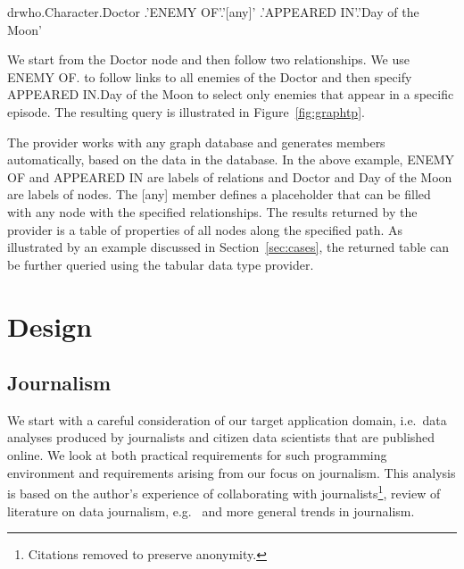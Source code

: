 \documentclass[manuscript,review,anonymous]{acmart}
\newcommand{\ikvd}[1]{{\fontfamily{zi4}\selectfont\small #1}}
\begin{document}
\begin{thegamma}
drwho.Character.Doctor
  .'ENEMY OF'.'[any]'
  .'APPEARED IN'.'Day of the Moon'
\end{thegamma}

\noindent
We start from the \ikvd{Doctor} node and then follow two relationships. We use
\ikvd{\textquotesingle ENEMY OF\textquotesingle.\textquotesingle [any]\textquotesingle}
to follow links to all enemies of the Doctor and then specify
\ikvd{\textquotesingle APPEARED IN\textquotesingle.\textquotesingle Day of the Moon\textquotesingle}
to select only enemies that appear in a specific episode. The resulting query
is illustrated in Figure~\ref{fig:graphtp}.

The provider works with any graph database and generates members automatically, based on the
data in the database. In the above example, \ikvd{ENEMY OF} and \ikvd{APPEARED IN} are labels
of relations and \ikvd{Doctor} and \ikvd{Day of the Moon} are labels of nodes. The
\ikvd{[any]} member defines a placeholder that can be filled with any node with the specified
relationships. The results returned by the provider is a table of properties of all nodes
along the specified path. As illustrated by an example discussed in Section~\ref{sec:cases},
the returned table can be further queried using the tabular data type provider.


\section{Design}
\label{sec:design}

\subsection{Journalism}

We start with a careful consideration of our target
application domain, i.e.~data analyses produced by journalists and citizen data scientists that
are published online. We look at both practical requirements for such programming environment
and requirements arising from our focus on journalism. This analysis is based on the author's
experience of collaborating with journalists\footnote{Citations removed to preserve anonymity.},
review of literature on data journalism, e.g.~\cite{ddj,edcj17,edcj18} and more general trends in
journalism.

\end{document}
